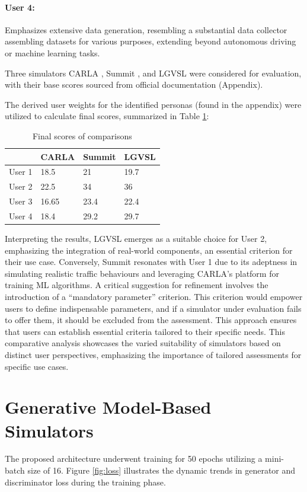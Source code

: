\documentclass[12pt,twoside,a4paper,parskip]{scrbook} %
\begin{document}
\paragraph*{User 4: } Emphasizes extensive data generation, resembling a substantial data collector assembling datasets for various purposes, extending beyond autonomous driving or machine learning tasks.

Three simulators CARLA \cite{Carla}, Summit \cite{SUMMIT}, and LGVSL \cite{lgsvl} were considered for evaluation, with their base scores sourced from official documentation (Appendix).

The derived user weights for the identified personas (found in the appendix) were utilized to calculate final scores, summarized in Table \ref{tab:score}:
\begin{table}[H]
\centering
\renewcommand{\arraystretch}{1.5} %
\begin{tabular}{|p{2.5cm}|p{2.5cm}|p{2.5cm}|p{2.5cm}|} %
\hline
       & CARLA & Summit & LGVSL \\
\hline
User 1 & 18.5  & 21     & 19.7  \\
User 2 & 22.5  & 34     & 36    \\
User 3 & 16.65 &23.4    &22.4 \\
User 4 & 18.4  &29.2    &29.7\\
\hline
\end{tabular}
\caption{Final scores of comparisons}
\label{tab:score}
\end{table}


Interpreting the results, LGVSL emerges as a suitable choice for User 2, emphasizing the integration of real-world components, an essential criterion for their use case. Conversely, Summit resonates with User 1 due to its adeptness in simulating realistic traffic behaviours and leveraging CARLA's platform for training ML algorithms. 
A critical suggestion for refinement involves the introduction of a “mandatory parameter” criterion. This criterion would empower users to define indispensable parameters, and if a simulator under evaluation fails to offer them, it should be excluded from the assessment. This approach ensures that users can establish essential criteria tailored to their specific needs.
This comparative analysis showcases the varied suitability of simulators based on distinct user perspectives, emphasizing the importance of tailored assessments for specific use cases.

\section{Generative Model-Based Simulators}
The proposed architecture underwent training for 50 epochs utilizing a mini-batch size of 16. Figure \ref{fig:loss} illustrates the dynamic trends in generator and discriminator loss during the training phase.
\end{document}
